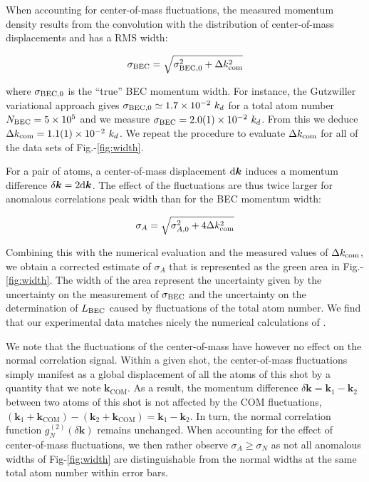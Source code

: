 When accounting for center-of-mass fluctuations, the measured momentum density results from the convolution with the distribution of center-of-mass displacements and has a RMS width:

\begin{equation}
    \sigma_{\rm{BEC}}=\sqrt{\sigma_{\rm{BEC},0}^2+\Delta k_{\rm{com}}^2}
\end{equation}

\noindent where $\sigma_{\rm{BEC},0}$ is the ``true'' BEC momentum width. For instance, the Gutzwiller variational approach gives  $\sigma_{\rm{BEC},0} \simeq 1.7 \times 10^{-2} \ k_d$ for a total atom number $N_{\rm{BEC}} = 5 \times 10^5$ and we measure $\sigma_{\rm{BEC}}=2.0(1) \times 10^{-2} \ k_d$. From this we deduce $\Delta k_{\rm{com}}=1.1(1) \times 10^{-2} \ k_d$. We repeat the procedure to evaluate $\Delta k_{\rm{com}}$ for all of the data sets of Fig.-\ref{fig:width}.

For a \kmk pair of atoms, a center-of-mass displacement ${\rm{d}} \bm{k}$ induces a momentum difference $\delta \bm{k}=2 {\rm{d}} \bm{k}$. The effect of the fluctuations are thus twice larger for anomalous correlations peak width than for the BEC momentum width:

\begin{equation}
    \sigma_A = \sqrt{\sigma_{A,0}^2+4\Delta k_{\rm{com}}^2}
\end{equation}

\noindent Combining this with the numerical evaluation and the measured values of $\Delta k_{\rm{com}}$, we obtain a corrected estimate of $\sigma_A$ that is represented as the green area in Fig.-\ref{fig:width}. The width of the area represent the uncertainty given by the uncertainty on the measurement of $\sigma_{\rm{BEC}}$ and the uncertainty on the determination of $L_{\rm BEC}$ caused by fluctuations of the total atom number. We find that our experimental data matches nicely the numerical calculations of \cite{butera2020}.

We note that the fluctuations of the center-of-mass have however no effect on the normal correlation signal. Within a given shot, the center-of-mass fluctuations simply manifest as a global displacement of all the atoms of this shot by a quantity that we note $\bm{k}_{\mathrm{COM}}$. As a result, the momentum difference $\delta \bm{k} = \bm{k}_1 - \bm{k}_2$ between two atoms of this shot is not affected by the COM fluctuations, $(\bm{k}_1+\bm{k}_{\mathrm{COM}}) - (\bm{k}_2+\bm{k}_{\mathrm{COM}})=\bm{k}_1 - \bm{k}_2$. In turn, the normal correlation function $g^{(2)}_{N}(\delta \bm{k})$ remains unchanged. When accounting for the effect of center-of-mass fluctuations, we then rather observe $\sigma_A \geq \sigma_N$ as not all anomalous widths of Fig-\ref{fig:width} are distinguishable from the normal widths at the same total atom number within error bars.

